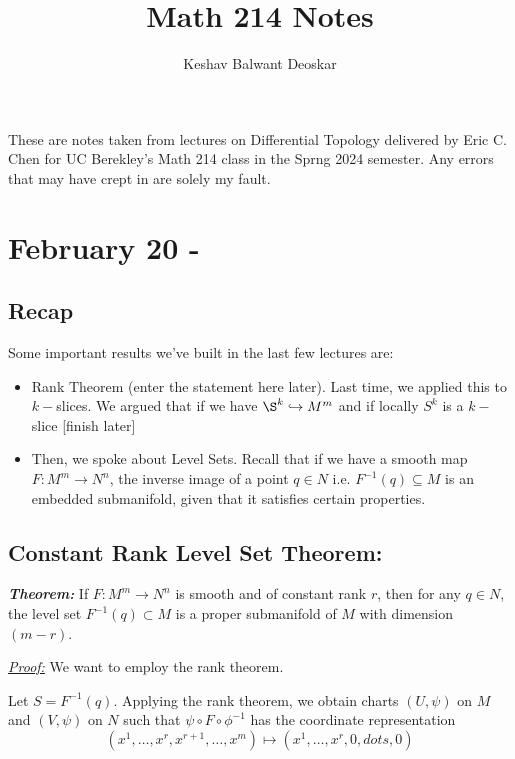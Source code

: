 \documentclass{article}
\title{Math 214 Notes}
\author{Keshav Balwant Deoskar}
\begin{document}
\maketitle

These are notes taken from lectures on Differential Topology delivered by Eric C. Chen for UC Berekley's Math 214 class in the Sprng 2024 semester. Any errors that may have crept in are solely my fault.

\tableofcontents

\pagebreak

\section{February 20 - }

\vskip 1cm
\subsection*{Recap}
Some important results we've built in the last few lectures are:
\begin{itemize}
  \item Rank Theorem (enter the statement here later). Last time, we applied this to $k-$slices. We argued that if we have $\S^k \hookrightarrow M^m$ and if locally $S^k$ is a $k-$slice [finish later]
  \item Then, we spoke about Level Sets. Recall that if we have a smooth map $F : M^m \rightarrow N^n$, the inverse image of a point $q \in N$ i.e. $F^{-1}(q) \subseteq M$ is an embedded submanifold, given that it satisfies certain properties.
\end{itemize}

\vskip 0.5cm
\subsection{Constant Rank Level Set Theorem:}

\begin{dottedbox}
  \emph{\textbf{Theorem:}} If $F: M^m \rightarrow N^n$ is smooth and of constant rank $r$, then for any $q \in N$, the level set $F^{-1}(q) \subset M$ is a proper submanifold of $M$ with dimension $(m-r)$.
\end{dottedbox}

\vskip 0.5cm
\underline{\emph{Proof:}} We want to employ the rank theorem.

\vskip 0.5cm
Let $S = F^{-1}(q)$. Applying the rank theorem, we obtain charts $(U, \psi)$ on $M$ and $(V, \psi)$ on $N$ such that $\psi \circ F \circ \phi^{-1}$ has the coordinate representation 
\[ (x^1, \dots, x^r, x^{r+1}, \dots, x^{m}) \mapsto (x^1, \dots, x^r, 0, dots, 0)  \]
\end{document}

